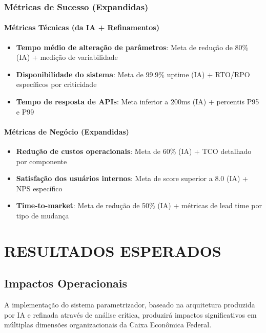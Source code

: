 \subsection{Métricas de Sucesso (Expandidas)}

\subsubsection{Métricas Técnicas (da IA + Refinamentos)}

\begin{itemize}
\item \textbf{Tempo médio de alteração de parâmetros}: Meta de redução de 80\% (IA) + medição de variabilidade
\item \textbf{Disponibilidade do sistema}: Meta de 99.9\% uptime (IA) + RTO/RPO específicos por criticidade
\item \textbf{Tempo de resposta de APIs}: Meta inferior a 200ms (IA) + percentis P95 e P99
\end{itemize}

\subsubsection{Métricas de Negócio (Expandidas)}

\begin{itemize}
\item \textbf{Redução de custos operacionais}: Meta de 60\% (IA) + TCO detalhado por componente
\item \textbf{Satisfação dos usuários internos}: Meta de score superior a 8.0 (IA) + NPS específico
\item \textbf{Time-to-market}: Meta de redução de 50\% (IA) + métricas de lead time por tipo de mudança
\end{itemize}

\chapter{RESULTADOS ESPERADOS}

\section{Impactos Operacionais}

A implementação do sistema parametrizador, baseado na arquitetura produzida por IA e refinada através de análise crítica, produzirá impactos significativos em múltiplas dimensões organizacionais da Caixa Econômica Federal.

